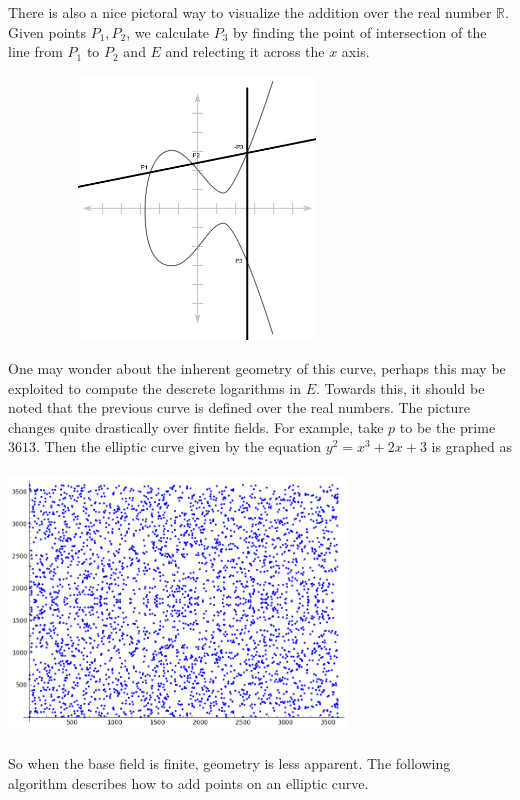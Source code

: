 There is also a nice pictoral way to visualize the addition over the real number $\mathbb{R}$. Given points $P_1,P_2$, we calculate $P_3$ by finding the point of intersection of the line from $P_1$ to $P_2$ and $E$ and relecting it across the $x$ axis. 
\begin{center}
	\includegraphics[width=10cm, height=7cm]{elliptic_curve_operation}
\end{center}
One may wonder about the inherent geometry of this curve, perhaps this may be exploited to compute the descrete logarithms in $E$. Towards this, it should be noted that the previous curve is defined over the real numbers. The picture changes quite drastically over fintite fields. For example, take $p$ to be the prime $3613$. Then the elliptic curve given by the equation $y^2 = x^3 + 2x + 3$ is graphed as 
\begin{center}
	\includegraphics[width=9cm, height=7cm]{elliptic_finite}
\end{center}
So when the base field is finite, geometry is less apparent. The following algorithm describes how to add points on an elliptic curve.
